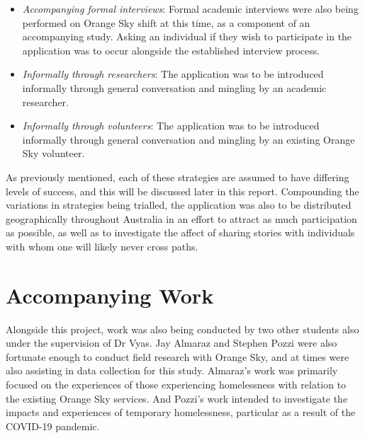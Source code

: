 \begin{itemize}
    \item \emph{Accompanying formal interviews}: Formal academic interviews were also being performed on Orange Sky shift at this time, as a component of an accompanying study. Asking an individual if they wish to participate in the application was to occur alongside the established interview process.
    \item \emph{Informally through researchers}: The application was to be introduced informally through general conversation and mingling by an academic researcher.
    \item \emph{Informally through volunteers}: The application was to be introduced informally through general conversation and mingling by an existing Orange Sky volunteer.
\end{itemize}

As previously mentioned, each of these strategies are assumed to have differing levels of success, and this will be discussed later in this report. Compounding the variations in strategies being trialled, the application was also to be distributed geographically throughout Australia in an effort to attract as much participation as possible, as well as to investigate the affect of sharing stories with individuals with whom one will likely never cross paths.

\section{Accompanying Work}

Alongside this project, work was also being conducted by two other students also under the supervision of Dr Vyas. Jay Almaraz and Stephen Pozzi were also fortunate enough to conduct field research with Orange Sky, and at times were also assisting in data collection for this study. Almaraz's work was primarily focused on the experiences of those experiencing homelessness with relation to the existing Orange Sky services. And Pozzi's work intended to investigate the impacts and experiences of temporary homelessness, particular as a result of the COVID-19 pandemic.